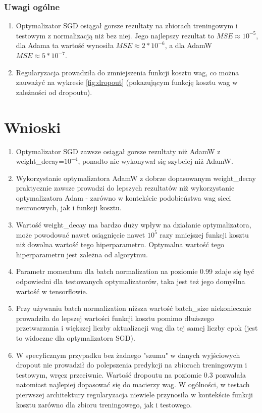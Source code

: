 \documentclass[12pt]{article}
\begin{document}
\subsubsection{Uwagi ogólne}
\begin{enumerate}
	\item Optymalizator SGD osiągał gorsze rezultaty na zbiorach treningowym i testowym z normalizacją niż bez niej. Jego najlepszy rezultat to $MSE \approx 10^{-5}$, dla Adama ta wartość wynosiła $MSE \approx 2*10^{-6}$, a dla AdamW $MSE \approx 5*10^{-7}$. \item Regularyzacja prowadziła do zmniejszenia funkcji kosztu wag, co można zauważyć na wykresie \ref{fig:dropout} (pokazującym funkcję kosztu wag w zależności od dropoutu).
\end{enumerate}

\clearpage

\section{Wnioski}
\begin{enumerate}
	\item Optymalizator SGD zawsze osiągał gorsze rezultaty niż AdamW z weight\_decay=$10^{-4}$, ponadto nie wykonywał się szybciej niż AdamW.
	\item Wykorzystanie optymalizatora AdamW z dobrze dopasowanym weight\_decay praktycznie zawsze prowadzi do lepszych rezultatów niż wykorzystanie optymalizatora Adam - zarówno w kontekście podobieństwa wag sieci neuronowych, jak i funkcji kosztu.
	\item Wartość weight\_decay ma bardzo duży wpływ na działanie optymalizatora, może powodować nawet osiągnięcie nawet $10^5$ razy mniejszej funkcji kosztu niż dowolna wartość tego hiperparametru. Optymalna wartość tego hiperparametru jest zależna od algorytmu.
	\item Parametr momentum dla batch normalization na poziomie 0.99 zdaje się być odpowiedni dla testowanych optymalizatorów, taka jest też jego domyślna wartość w tensorflowie.
	\item Przy używaniu batch normalization niższa wartość batch\_size niekoniecznie prowadziła do lepszej wartości funkcji kosztu pomimo dłuższego przetwarzania i większej liczby aktualizacji wag dla tej samej liczby epok (jest to widoczne dla optymalizatora SGD).
	\item W specyficznym przypadku bez żadnego "szumu" w danych wyjściowych dropout nie prowadził do polepszenia predykcji na zbiorach treningowym i testowym, wręcz przeciwnie. Wartość dropoutu na poziomie 0.3 pozwalała natomiast najlepiej dopasować się do macierzy wag. W ogólności, w testach pierwszej architektury regularyzacja niewiele przynosiła w kontekście funkcji kosztu zarówno dla zbioru treningowego, jak i testowego.
\end{enumerate}
\end{document}
